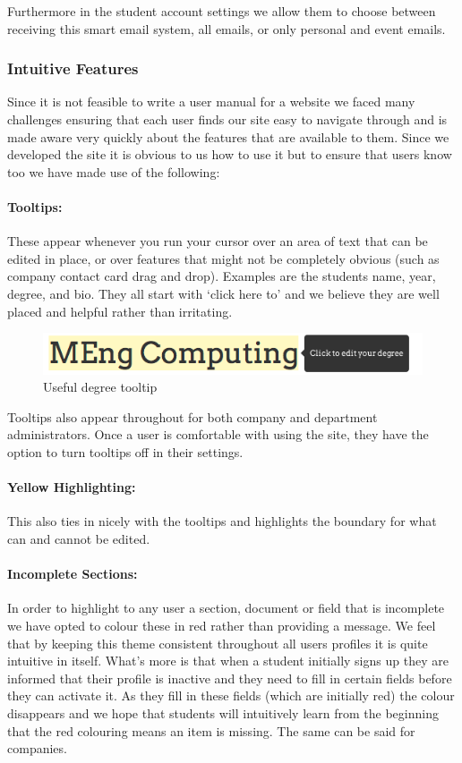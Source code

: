     Furthermore in the student account settings we allow them to choose between receiving this smart email system, all emails, or only personal and event emails.

  \subsubsection{Intuitive Features}
    Since it is not feasible to write a user manual for a website we faced many challenges ensuring that each user finds our site easy to navigate through and is made aware very quickly about the features that are available to them. Since we developed the site it is obvious to us how to use it but to ensure that users know too we have made use of the following:

    \paragraph{Tooltips:} These appear whenever you run your cursor over an area of text that can be edited in place, or over features that might not be completely obvious (such as company contact card drag and drop). Examples are the students name, year, degree, and bio. They all start with `click here to' and we believe they are well placed and helpful rather than irritating.      
    \begin{figure}[H]\centering
    \includegraphics[scale=0.5]{images/design/edit_degree_tooltip}
    \caption{Useful degree tooltip}
    \end{figure}
    Tooltips also appear throughout for both company and department administrators.
    Once a user is comfortable with using the site, they have the option to turn tooltips off in their settings.

    \paragraph{Yellow Highlighting:} This also ties in nicely with the tooltips and highlights the boundary for what can and cannot be edited.

    \paragraph{Incomplete Sections:} In order to highlight to any user a section, document or field that is incomplete we have opted to colour these in red rather than providing a message. We feel that by keeping this theme consistent throughout all users profiles it is quite intuitive in itself.
    What's more is that when a student initially signs up they are informed that their profile is inactive and they need to fill in certain fields before they can activate it. As they fill in these fields (which are initially red) the colour disappears and we hope that students will intuitively learn from the beginning that the red colouring means an item is missing. The same can be said for companies.

